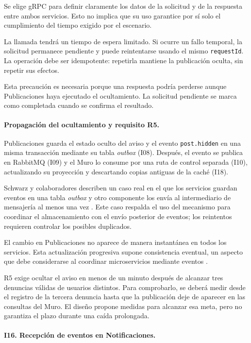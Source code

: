 \documentclass[12pt,a4paper]{article}
\begin{document}
Se elige gRPC para definir claramente los datos de la solicitud
y de la respuesta entre ambos servicios. Esto no implica
que su uso garantice por sí solo el cumplimiento del tiempo
exigido por el escenario.

La llamada tendrá un tiempo de espera limitado. Si ocurre
un fallo temporal, la solicitud permanece pendiente y puede
reintentarse usando el mismo \texttt{requestId}. La operación
debe ser idempotente: repetirla mantiene la publicación oculta,
sin repetir sus efectos.

Esta precaución es necesaria porque una respuesta podría
perderse aunque Publicaciones haya ejecutado el ocultamiento.
La solicitud pendiente se marca como completada cuando se
confirma el resultado.

\paragraph{Propagación del ocultamiento y requisito R5.}

Publicaciones guarda el estado oculto del aviso y el evento
\texttt{post.hidden} en una misma transacción mediante su
tabla \textit{outbox} (I08). Después, el evento se publica
en RabbitMQ (I09) y el Muro lo consume por una ruta de control
separada (I10), actualizando su proyección y descartando
copias antiguas de la caché (I18).

Schwarz y colaboradores describen un caso real en el que
los servicios guardan eventos en una tabla \textit{outbox}
y otro componente los envía al intermediario de mensajería
al menos una vez \cite{schwarz2025outbox}. Este caso respalda
el uso del mecanismo para coordinar el almacenamiento
con el envío posterior de eventos; los reintentos requieren
controlar los posibles duplicados.

El cambio en Publicaciones no aparece de manera instantánea
en todos los servicios. Esta actualización progresiva supone
consistencia eventual, un aspecto que debe considerarse
al coordinar microservicios mediante eventos
\cite{bacao2026consistency}.

R5 exige ocultar el aviso en menos de un minuto después
de alcanzar tres denuncias válidas de usuarios distintos.
Para comprobarlo, se deberá medir desde el registro de
la tercera denuncia hasta que la publicación deje de
aparecer en las consultas del Muro. El diseño propone
medidas para alcanzar esa meta, pero no garantiza el plazo
durante una caída prolongada.

\paragraph{I16. Recepción de eventos en Notificaciones.}
\end{document}
